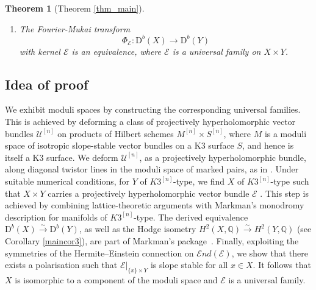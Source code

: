 \documentclass[12pt,a4paper]{amsart}
\theoremstyle{plain}
\newtheorem{mainthm}{Theorem}
\theoremstyle{definition}
\theoremstyle{remark}
\def\H{H}
\newcommand{\D}{\mathrm{D}^b}
\newcommand{\kE}{\mathcal{E}}
\newcommand{\rk}{\mathrm{rk}}
\newcommand{\dv}{\mathrm{div}}
\newcommand{\cc}{c}
\begin{document}
\begin{mainthm}[Theorem \ref{thm_main}]
\begin{enumerate}[label=$\bullet$]
    \begin{minipage}[l]{0.40\textwidth}
    \begin{equation*}
        \cc_1(E)= \bigg\{\begin{array}{ll}
           r^{n-1}n! w  & \textit{if }\dv(w) \textit{ is odd} \\
           r^{n-1}n! \frac{w}{2}  & \textit{if }\dv(w) \textit{ is even}
        \end{array}
    \end{equation*}
\end{minipage}
\hspace{1ex}%
\begin{minipage}[l]{0.35\textwidth}
    \begin{align*}
       \rk(E)&= r^n n!\\
        \Delta(E) &= \frac{(r^n n!)^2}{12}\cc_2(Y).\end{align*}
\end{minipage}
\vspace{0.5ex}

    
    \item The  Fourier-Mukai transform $$\Phi_\kE \colon \D(X) \to \D(Y)$$ with kernel $\kE$ is an equivalence, where $\mathcal{E}$ is a  universal family on $X\times Y$.

\end{enumerate}
\end{mainthm}




\subsection*{Idea of proof}
We exhibit moduli spaces by constructing the corresponding  universal families. This is achieved by deforming a class of projectively hyperholomorphic vector bundles $\mathcal{U}^{[n]}$ on products of Hilbert schemes $M^{[n]}\times S^{[n]}$, where $M$ is a moduli space of isotropic slope-stable vector bundles on a K3 surface $S$, and hence is itself a K3 surface. We deform $\mathcal{U}^{[n]}$, as a projectively hyperholomorphic bundle, along diagonal twistor lines in the moduli space of marked pairs, as in \cite{markman}. 
Under suitable numerical conditions, for $Y$ of $K3^{[n]}$-type, we find $X$ of  $K3^{[n]}$-type such that $X\times Y$ carries a projectively hyperholomorphic vector bundle $\mathcal{E}$ . 
This step is achieved by combining lattice-theoretic arguments with Markman's monodromy description for manifolds of $K3^{[n]}$-type. The  derived equivalence $\D(X)\xrightarrow{\sim} \D(Y)$, as well as the Hodge isometry $\H^2(X,\mathbb{Q})\xrightarrow{\sim} \H^2(Y,\mathbb{Q})$ (see Corollary \ref{maincor3}), are part of Markman's package~\cite{markman}. Finally, exploiting the symmetries of the Hermite--Einstein connection on $\mathcal{E}nd(\mathcal{E})$, we show that there exists a polarisation such that $\mathcal{E}|_{\{x\}\times Y}$ is slope stable for all $x\in X$. It follows that $X$ is isomorphic to a component of the moduli space and $\mathcal{E}$ is a  universal family.
\end{document}
